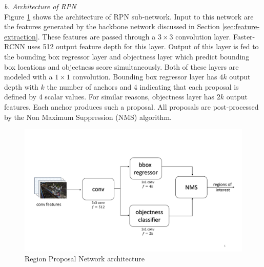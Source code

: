 \vspace{5pt}
\textit{b. Architecture of RPN}\\
Figure \ref{fig:RPN-architecture} shows the architecture of RPN sub-network. Input to this network are the features generated by the backbone network discussed in Section \ref{sec:feature-extraction}. These features are passed through a $3\times3$ 
convolution layer. Faster-RCNN uses 512 output feature depth for this layer. Output of this layer is fed to the bounding box regressor layer and objectness layer which predict bounding box locations and objectness score simultaneously.
Both of these layers are modeled with a $1\times1$ convolution. Bounding box regressor layer has $4k$ output depth with $k$ the number of anchors and 4 indicating that each proposal is defined by 4 scalar values. For similar reasons, objectness layer has $2k$ output features. Each anchor produces such a proposal. All proposals are post-processed by the Non Maximum Suppression (NMS) algorithm. 


\begin{figure}
    \centering
    \includegraphics[width=\linewidth,trim={0 70 0 110},clip]{images/RPN-architecture}
    \caption[RPN architecture]{Region Proposal Network architecture}
    \label{fig:RPN-architecture}
\end{figure}


\vspace{5pt}
